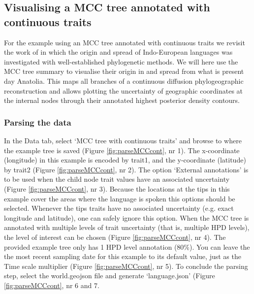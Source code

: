 \documentclass[english]{paper}
\begin{document}
\subsection{Visualising a MCC tree annotated with continuous traits}
\label{MCCcontinuous}

For the example using an MCC tree annotated with continuous traits we revisit the work of \citet{Bouckaert:2012aa} in which the origin and spread of Indo-European languages was investigated with well-established phylogenetic methods.
We will here use the MCC tree summary to visualise their origin in and spread from what is present day Anatolia. 
This maps all branches of a continuous diffusion phylogeographic reconstruction and allows plotting the uncertainty of geographic coordinates at the internal nodes through their annotated highest posterior density contours.

\subsubsection{Parsing the data}
\label{MCCcontParse}

In the Data tab, select `MCC tree with continuous traits' and browse to where the example tree is saved (Figure \ref{fig:parseMCCcont}, nr 1).
The x-coordinate (longitude) in this example is encoded by trait1, and the y-coordinate (latitude) by trait2 (Figure \ref{fig:parseMCCcont}, nr 2).
The option `External annotations' %
is to be used when the child node trait values have an associated uncertainty (Figure \ref{fig:parseMCCcont}, nr 3).
Because the locations at the tips in this example cover the areas where the language is spoken this options should be selected.
Whenever the tips traits have no associated uncertainty (e.g. exact longitude and latitude), one can safely ignore this option. 
When the MCC tree is annotated with multiple levels of trait uncertainty (that is, multiple HPD levels), the level of interest can be chosen (Figure \ref{fig:parseMCCcont}, nr 4).
The provided example tree only has 1 HPD level annotation (80\%).
You can leave the the most recent sampling date for this example to its default value, just as the Time scale multiplier (Figure \ref{fig:parseMCCcont}, nr 5).
To conclude the parsing step, select the world.geojson file and generate `language.json' (Figure \ref{fig:parseMCCcont}, nr 6 and 7.
\end{document}
